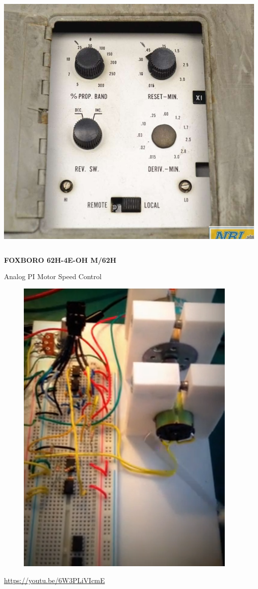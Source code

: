 \begin{frame}
\begin{columns}
\begin{column}{0.5\linewidth}
			\includegraphics[height=0.6\textheight]{img/fb4}
		\end{column}
	\end{columns}
	\begin{center}
		\textbf{FOXBORO 62H-4E-OH M/62H}
	\end{center}
\end{frame}

\begin{frame}{Analog PI Motor Speed Control}
	\begin{figure}
		\centering
		\includegraphics[width=0.4\linewidth]{img/feedback_motor}
	\end{figure}
	\url{https://youtu.be/6W3PLiVIcmE}
\end{frame}

